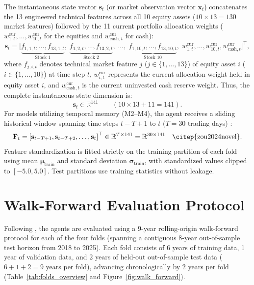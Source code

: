 The instantaneous state vector $\mathbf{s}_t$ (or market observation vector $\mathbf{x}_t$) concatenates the 13 engineered technical features across all 10 equity assets ($10 \times 13 = 130$ market features) followed by the 11 current portfolio allocation weights ($w_{1,t}^{\text{cur}}, \dots, w_{10,t}^{\text{cur}}$ for the equities and $w_{\text{cash},t}^{\text{cur}}$ for cash):
\begin{equation}
\mathbf{s}_t = \Big[ \underbrace{f_{1,1,t}, \dots, f_{13,1,t}}_{\text{Stock 1}}, \; \underbrace{f_{1,2,t}, \dots, f_{13,2,t}}_{\text{Stock 2}}, \; \dots, \; \underbrace{f_{1,10,t}, \dots, f_{13,10,t}}_{\text{Stock 10}}, \; w_{1,t}^{\text{cur}}, \dots, w_{10,t}^{\text{cur}}, w_{\text{cash},t}^{\text{cur}} \Big]^\top,
\label{eq:state_vector}
\end{equation}
where $f_{j,i,t}$ denotes technical market feature $j$ ($j \in \{1, \dots, 13\}$) of equity asset $i$ ($i \in \{1, \dots, 10\}$) at time step $t$, $w_{i,t}^{\text{cur}}$ represents the current allocation weight held in equity asset $i$, and $w_{\text{cash},t}^{\text{cur}}$ is the current uninvested cash reserve weight.
Thus, the complete instantaneous state dimension is:
\begin{equation}
\boxed{\mathbf{s}_t \in \mathbb{R}^{141}} \qquad (10 \times 13 + 11 = 141).
\end{equation}
For models utilizing temporal memory (M2--M4), the agent receives a sliding historical window spanning time steps $t-T+1$ to $t$ ($T = 30$ trading days) \citep{zou2024novel}:
\begin{equation}
\mathbf{F}_t = \left[ \mathbf{s}_{t-T+1}, \mathbf{s}_{t-T+2}, \dots, \mathbf{s}_t \right]^\top \in \mathbb{R}^{T \times 141} = \mathbb{R}^{30 \times 141} \quad \text{\citep{zou2024novel}}.
\end{equation}
Feature standardization is fitted strictly on the training partition of each fold using mean $\boldsymbol{\mu}_{\text{train}}$ and standard deviation $\boldsymbol{\sigma}_{\text{train}}$, with standardized values clipped to $[-5.0, 5.0]$. Test partitions use training statistics without leakage.

\section{Walk-Forward Evaluation Protocol}
Following \citet{liu2024dynamic}, the agents are evaluated using a 9-year rolling-origin walk-forward protocol for each of the four folds (spanning a contiguous 8-year out-of-sample test horizon from 2018 to 2025). Each fold consists of 6 years of training data, 1 year of validation data, and 2 years of held-out out-of-sample test data ($6 + 1 + 2 = 9$ years per fold), advancing chronologically by 2 years per fold (Table~\ref{tab:folds_overview} and Figure~\ref{fig:walk_forward}).

